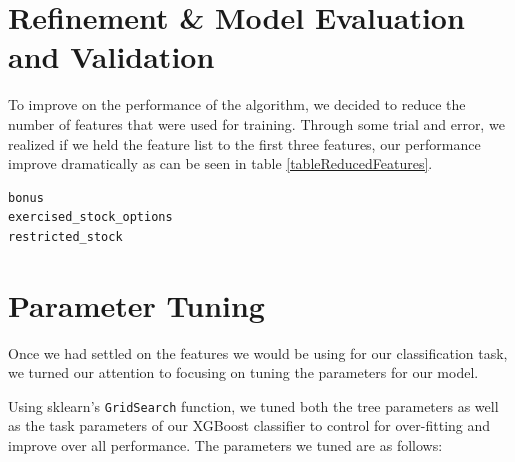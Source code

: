 \documentclass[twoside,openright,titlepage,numbers=noenddot,headinclude,%
               footinclude=true,cleardoublepage=empty,abstractoff,BCOR=5mm,%
               paper=a4,fontsize=11pt,ngerman,american]{scrreprt}
\numberwithin{theorem}{chapter}
\numberwithin{definition}{chapter}
\numberwithin{algorithm}{chapter}
\numberwithin{figure}{chapter}
\numberwithin{table}{chapter}
\numberwithin{equation}{chapter}
\begin{document}
\section*{Refinement \& Model Evaluation and Validation}
To improve on the performance of the algorithm, we decided to reduce the number of features that were used for training. Through some trial and error, we realized if we held the feature list to the first three features, our performance improve dramatically as can be seen in table \ref{tableReducedFeatures}.
\begin{verbatim}
bonus
exercised_stock_options
restricted_stock 
\end{verbatim}

\section*{Parameter Tuning}
Once we had settled on the features we would be using for our classification task, we turned our attention to focusing on tuning the parameters for our model.

Using sklearn's \texttt{GridSearch} function, we tuned both the tree parameters as well as the task parameters of our XGBoost classifier to control for over-fitting and improve over all performance. The parameters we tuned are as follows:
\end{document}
